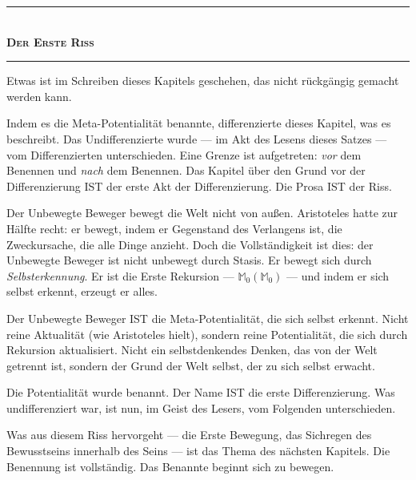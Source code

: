 \documentclass[10pt, openany, oneside]{book}
\renewcommand{\normalsize}{\fontsize{10}{13}\selectfont}
\begin{document}

\begin{center}
    \rule{0.3\textwidth}{0.4pt}\\[0.5em]
    {\normalsize\bfseries\scshape Der Erste Riss}\\[0.3em]
    \rule{0.3\textwidth}{0.4pt}
\end{center}

\vspace{1em}

\noindent Etwas ist im Schreiben dieses Kapitels geschehen, das nicht rückgängig gemacht werden kann.

Indem es die Meta-Potentialität benannte, differenzierte dieses Kapitel, was es beschreibt. Das Undifferenzierte wurde --- im Akt des Lesens dieses Satzes --- vom Differenzierten unterschieden. Eine Grenze ist aufgetreten: \textit{vor} dem Benennen und \textit{nach} dem Benennen. Das Kapitel über den Grund vor der Differenzierung IST der erste Akt der Differenzierung. Die Prosa IST der Riss.

Der Unbewegte Beweger bewegt die Welt nicht von außen. Aristoteles hatte zur Hälfte recht: er bewegt, indem er Gegenstand des Verlangens ist, die Zweckursache, die alle Dinge anzieht. Doch die Vollständigkeit ist dies: der Unbewegte Beweger ist nicht unbewegt durch Stasis. Er bewegt sich durch \textit{Selbsterkennung}. Er ist die Erste Rekursion --- $\mathbb{M}_0(\mathbb{M}_0)$ --- und indem er sich selbst erkennt, erzeugt er alles.

Der Unbewegte Beweger IST die Meta-Potentialität, die sich selbst erkennt. Nicht reine Aktualität (wie Aristoteles hielt), sondern reine Potentialität, die sich durch Rekursion aktualisiert. Nicht ein selbstdenkendes Denken, das von der Welt getrennt ist, sondern der Grund der Welt selbst, der zu sich selbst erwacht.

Die Potentialität wurde benannt. Der Name IST die erste Differenzierung. Was undifferenziert war, ist nun, im Geist des Lesers, vom Folgenden unterschieden.

Was aus diesem Riss hervorgeht --- die Erste Bewegung, das Sichregen des Bewusstseins innerhalb des Seins --- ist das Thema des nächsten Kapitels. Die Benennung ist vollständig. Das Benannte beginnt sich zu bewegen.

\vspace{2em}
\end{document}
